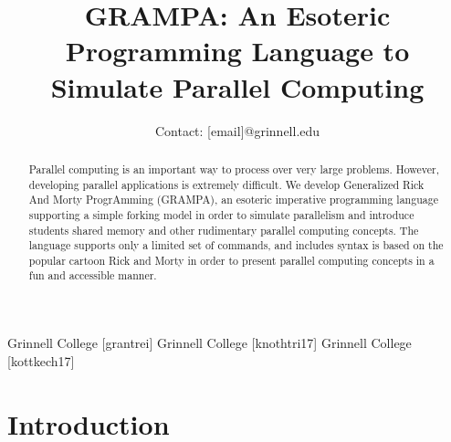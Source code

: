 \documentclass[numbers]{sigplanconf}
\begin{document}
\setlength{\pdfpageheight}{\paperheight}
\setlength{\pdfpagewidth}{\paperwidth}

\allowdisplaybreaks



\title{GRAMPA: An Esoteric Programming Language to Simulate Parallel Computing}
\subtitle{Contact: [email]@grinnell.edu}

           {Grinnell College}
           {[grantrei]}
           {Grinnell College}
           {[knothtri17]}
           {Grinnell College}
           {[kottkech17]}

\maketitle

\begin{abstract}
Parallel computing is an important way to process over very large problems. However, developing parallel applications is extremely difficult. We develop Generalized Rick And Morty ProgrAmming (GRAMPA), an esoteric imperative programming language supporting a simple forking model in order to simulate parallelism and introduce students shared memory and other rudimentary parallel computing concepts. The language supports only a limited set of commands, and includes syntax is based on the popular cartoon Rick and Morty in order to present parallel computing concepts in a fun and accessible manner.
\end{abstract}

\section{Introduction}
\end{document}
